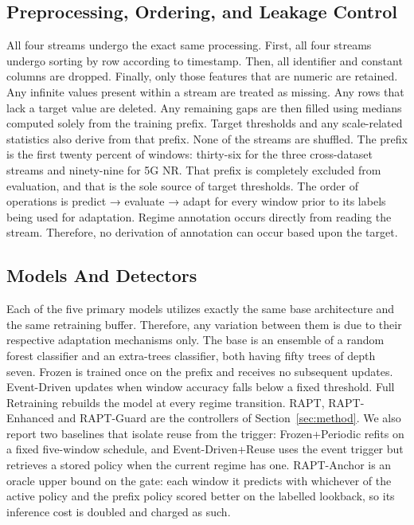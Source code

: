\documentclass[conference]{IEEEtran}
\begin{document}



\subsection{Preprocessing, Ordering, and Leakage Control} 
All four streams undergo the exact same processing. First, all four streams undergo sorting by row according to timestamp. Then, all identifier and constant columns are dropped. Finally, only those features that are numeric are retained. Any infinite values present within a stream are treated as missing. Any rows that lack a target value are deleted. Any remaining gaps are then filled using medians computed solely from the training prefix. Target thresholds and any scale-related statistics also derive from that prefix. None of the streams are shuffled. The prefix is the first twenty percent of windows: thirty-six for the three cross-dataset streams and ninety-nine for 5G NR. That prefix is completely excluded from evaluation, and that is the sole source of target thresholds. The order of operations is predict → evaluate → adapt for every window prior to its labels being used for adaptation. Regime annotation occurs directly from reading the stream. Therefore, no derivation of annotation can occur based upon the target.


\subsection{Models And Detectors}
Each of the five primary models utilizes exactly the same base architecture and the same retraining buffer. Therefore, any variation between them is due to their respective adaptation mechanisms only. The base is an ensemble of a random forest classifier and an extra-trees classifier, both having fifty trees of depth seven. Frozen is trained once on the prefix and receives no subsequent updates. Event-Driven updates when window accuracy falls below a fixed threshold. Full Retraining rebuilds the model at every regime transition. RAPT, RAPT-Enhanced and RAPT-Guard are the controllers of Section~\ref{sec:method}. We also report two baselines that isolate reuse from the trigger: Frozen+Periodic refits on a fixed five-window schedule, and Event-Driven+Reuse uses the event trigger but retrieves a stored policy when the current regime has one. RAPT-Anchor is an oracle upper bound on the gate: each window it predicts with whichever of the active policy and the prefix policy scored better on the labelled lookback, so its inference cost is doubled and charged as such.
\end{document}
